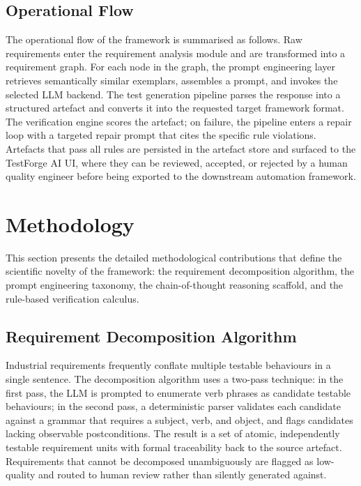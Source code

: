\documentclass[11pt,letterpaper]{article}
\begin{document}
\subsection{Operational Flow}

The operational flow of the framework is summarised as follows. Raw requirements enter the requirement analysis module and are transformed into a requirement graph. For each node in the graph, the prompt engineering layer retrieves semantically similar exemplars, assembles a prompt, and invokes the selected LLM backend. The test generation pipeline parses the response into a structured artefact and converts it into the requested target framework format. The verification engine scores the artefact; on failure, the pipeline enters a repair loop with a targeted repair prompt that cites the specific rule violations. Artefacts that pass all rules are persisted in the artefact store and surfaced to the TestForge AI UI, where they can be reviewed, accepted, or rejected by a human quality engineer before being exported to the downstream automation framework.

\begin{table}[!t]
\centering
\caption{Responsibilities, inputs, and outputs of each RAITG subsystem}
\label{tab:raitg_subsystems}


\end{table}

\section{Methodology}
\label{sec:methodology}

This section presents the detailed methodological contributions that define the scientific novelty of the framework: the requirement decomposition algorithm, the prompt engineering taxonomy, the chain-of-thought reasoning scaffold, and the rule-based verification calculus.

\subsection{Requirement Decomposition Algorithm}

Industrial requirements frequently conflate multiple testable behaviours in a single sentence. The decomposition algorithm uses a two-pass technique: in the first pass, the LLM is prompted to enumerate verb phrases as candidate testable behaviours; in the second pass, a deterministic parser validates each candidate against a grammar that requires a subject, verb, and object, and flags candidates lacking observable postconditions. The result is a set of atomic, independently testable requirement units with formal traceability back to the source artefact. Requirements that cannot be decomposed unambiguously are flagged as low-quality and routed to human review rather than silently generated against.
\end{document}
